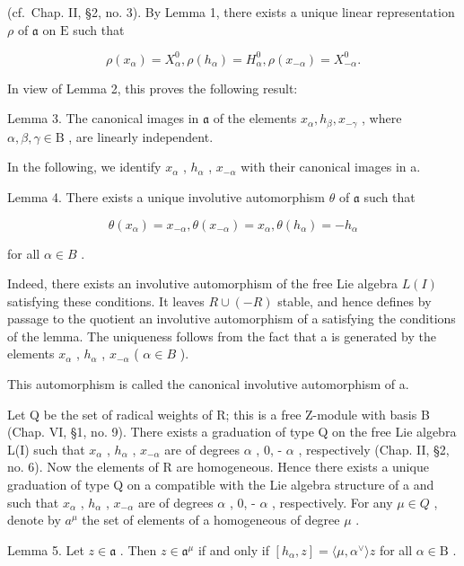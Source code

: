 (cf.~Chap. II, §2, no. 3). By Lemma 1, there exists a unique linear representation \(\rho\) of \(\mathfrak{a}\) on \(\mathrm{E}\) such that

\[
\rho (x _ {\alpha}) = X _ {\alpha} ^ {0}, \rho (h _ {\alpha}) = H _ {\alpha} ^ {0}, \rho (x _ {- \alpha}) = X _ {- \alpha} ^ {0}.
\]

In view of Lemma 2, this proves the following result:

Lemma 3. The canonical images in \(\mathfrak{a}\) of the elements \(x_{\alpha}, h_{\beta}, x_{-\gamma}\) , where \(\alpha, \beta, \gamma \in \mathrm{B}\) , are linearly independent.

In the following, we identify \(x_{\alpha}\) , \(h_{\alpha}\) , \(x_{-\alpha}\) with their canonical images in a.

Lemma 4. There exists a unique involutive automorphism \(\theta\) of \(\mathfrak{a}\) such that

\[
\theta (x _ {\alpha}) = x _ {- \alpha}, \theta (x _ {- \alpha}) = x _ {\alpha}, \theta (h _ {\alpha}) = - h _ {\alpha}
\]

for all \(\alpha\in B\) .

Indeed, there exists an involutive automorphism of the free Lie algebra \(L(I)\) satisfying these conditions. It leaves \(R \cup (-R)\) stable, and hence defines by passage to the quotient an involutive automorphism of a satisfying the conditions of the lemma. The uniqueness follows from the fact that a is generated by the elements \(x_{\alpha}\) , \(h_{\alpha}\) , \(x_{-\alpha}\) ( \(\alpha \in B\) ).

This automorphism is called the canonical involutive automorphism of a.

Let Q be the set of radical weights of R; this is a free Z-module with basis B (Chap. VI, §1, no. 9). There exists a graduation of type Q on the free Lie algebra L(I) such that \(x_{\alpha}\) , \(h_{\alpha}\) , \(x_{-\alpha}\) are of degrees \(\alpha\) , 0, - \(\alpha\) , respectively (Chap. II, §2, no. 6). Now the elements of R are homogeneous. Hence there exists a unique graduation of type Q on a compatible with the Lie algebra structure of a and such that \(x_{\alpha}\) , \(h_{\alpha}\) , \(x_{-\alpha}\) are of degrees \(\alpha\) , 0, - \(\alpha\) , respectively. For any \(\mu \in Q\) , denote by \(a^{\mu}\) the set of elements of a homogeneous of degree \(\mu\) .

Lemma 5. Let \(z \in \mathfrak{a}\) . Then \(z \in \mathfrak{a}^{\mu}\) if and only if \([h_{\alpha}, z] = \langle \mu, \alpha^{\vee} \rangle z\) for all \(\alpha \in \mathrm{B}\) .

